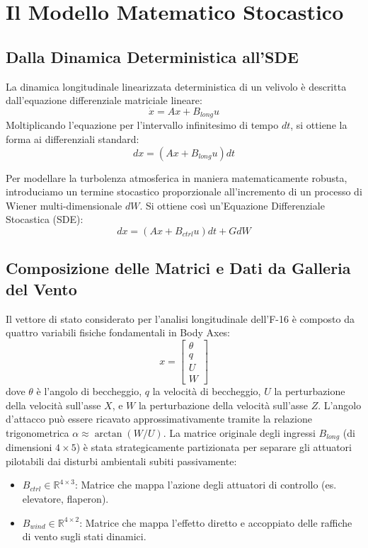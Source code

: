 \documentclass[12pt,a4paper]{article}
\begin{document}
\section{Il Modello Matematico Stocastico}

\subsection{Dalla Dinamica Deterministica all'SDE}
La dinamica longitudinale linearizzata deterministica di un velivolo è descritta dall'equazione differenziale matriciale lineare:
\begin{equation}
    \dot{x} = A x + B_{long} u
\end{equation}
Moltiplicando l'equazione per l'intervallo infinitesimo di tempo $dt$, si ottiene la forma ai differenziali standard:
\begin{equation}
    dx = (A x + B_{long} u) dt
\end{equation}

Per modellare la turbolenza atmosferica in maniera matematicamente robusta, introduciamo un termine stocastico proporzionale all'incremento di un processo di Wiener multi-dimensionale $dW$. Si ottiene così un'Equazione Differenziale Stocastica (SDE):
\begin{equation}
    dx = (A x + B_{ctrl} u) dt + G dW
\end{equation}

\subsection{Composizione delle Matrici e Dati da Galleria del Vento}
Il vettore di stato considerato per l'analisi longitudinale dell'F-16 è composto da quattro variabili fisiche fondamentali in Body Axes:
\begin{equation}
    x = \begin{bmatrix} \theta \\ q \\ U \\ W \end{bmatrix}
\end{equation}
dove $\theta$ è l'angolo di beccheggio, $q$ la velocità di beccheggio, $U$ la perturbazione della velocità sull'asse $X$, e $W$ la perturbazione della velocità sull'asse $Z$. L'angolo d'attacco può essere ricavato approssimativamente tramite la relazione trigonometrica $\alpha \approx \arctan(W/U)$. La matrice originale degli ingressi $B_{long}$ (di dimensioni $4 \times 5$) è stata strategicamente partizionata per separare gli attuatori pilotabili dai disturbi ambientali subiti passivamente:
\begin{itemize}
    \item $B_{ctrl} \in \mathbb{R}^{4 \times 3}$: Matrice che mappa l'azione degli attuatori di controllo (es. elevatore, flaperon).
    \item $B_{wind} \in \mathbb{R}^{4 \times 2}$: Matrice che mappa l'effetto diretto e accoppiato delle raffiche di vento sugli stati dinamici.
\end{itemize}
\end{document}
